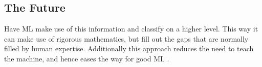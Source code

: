 \documentclass[main.tex]{subfiles}
\begin{document}
    \subsection{The Future}
    
      Have ML make use of this information and classify on a higher level. This way it can make use of rigorous mathematics, but fill out the gaps that are normally filled by human expertise. Additionally this approach reduces the need to teach the machine, and hence eases the way for good ML \cite{}.
    
\end{document}
